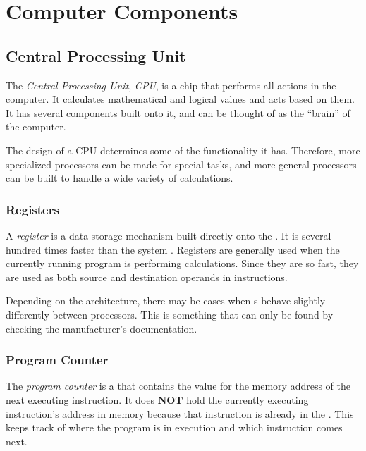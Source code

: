 \section{Computer Components}\label{app:Computer_Components}
\subsection{Central Processing Unit}\label{subsec:CPU}
\begin{definition}\label{def:CPU}
  The \emph{Central Processing Unit}, \emph{CPU}, is a chip that performs all actions in the computer.
  It calculates mathematical and logical values and acts based on them.
  It has several components built onto it, and can be thought of as the ``brain'' of the computer.

  The design of a CPU determines some of the functionality it has.
  Therefore, more specialized processors can be made for special tasks, and more general processors can be built to handle a wide variety of calculations.
\end{definition}

\subsubsection{Registers}\label{subsubsec:Registers}
\begin{definition}[Register]\label{def:Register}
  A \emph{register} is a data storage mechanism built directly onto the .
  It is several hundred times faster than the system .
  Registers are generally used when the currently running program is performing calculations.
  Since they are so fast, they are used as both source and destination operands in instructions.

  \begin{remark}
    Depending on the  architecture, there may be cases when s behave slightly differently between processors.
    This is something that can only be found by checking the  manufacturer's documentation.
  \end{remark}
\end{definition}

\subsubsection{Program Counter}\label{subsubsec:Program_Counter}
\begin{definition}\label{def:Program_Counter}
  The \emph{program counter} is a  that contains the value for the memory address of the next executing instruction.
  It does \textbf{NOT} hold the currently executing instruction's address in memory because that instruction is already in the .
  This keeps track of where the program is in execution and which instruction comes next.
\end{definition}

